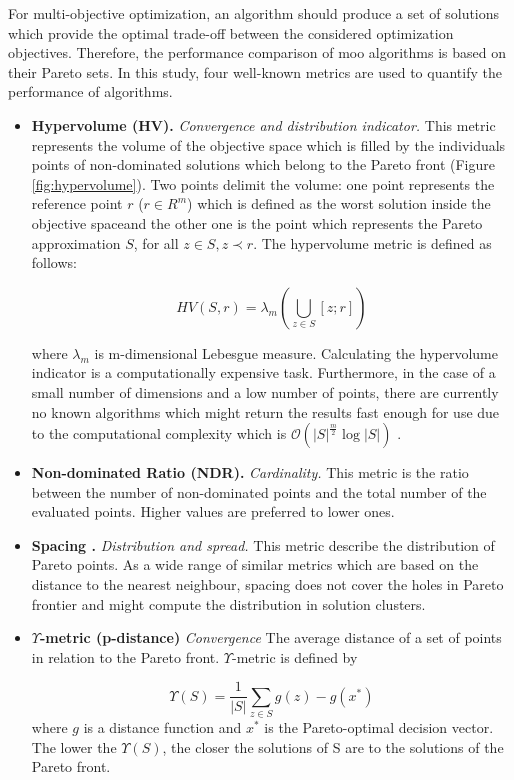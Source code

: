             For multi-objective optimization, an algorithm should produce a set of solutions which provide the optimal trade-off between the considered optimization objectives. Therefore, the performance comparison of \gls{moo} algorithms is based on their Pareto sets. In this study, four well-known metrics are used to quantify the performance of algorithms.
            \begin{itemize}
                \item \textbf{Hypervolume (HV).}\cite{ZitzlerDT00} \textit{Convergence and distribution indicator.}
                This metric represents the volume of the objective space which is filled by the individuals points of non-dominated solutions which belong to the Pareto front (Figure \ref{fig:hypervolume}). Two points delimit the volume: one point represents the reference point $r$ ($r \in R^m$) which is defined as the worst solution inside the objective spaceand the other one is the point which represents the Pareto approximation $S$, for all $z \in S, z \prec r$. The hypervolume metric is defined as follows:

                    \[HV(S,r) = \lambda_m(\bigcup\limits_{z \in S} [z;r])\]

                where $\lambda_m$ is m-dimensional Lebesgue measure.    
                Calculating the hypervolume indicator is a computationally expensive task. Furthermore, in the case of a small number of dimensions and a low number of points, there are currently no known algorithms which might return the results fast enough for use due to the computational complexity which is 
                $\mathcal{O}(|S|^{\frac{m}{2}}\log{|S|}) $ \cite{BeumeFLPV09}.
                \item \textbf{Non-dominated Ratio (NDR).} \textit{Cardinality.} This metric is the ratio between the number of non-dominated points and the total number of the evaluated points.  Higher values are preferred to lower ones.
                \item \textbf{Spacing \cite{Schott1995FaultTD}.} \textit{Distribution and spread.} This metric describe the distribution of Pareto points. As a wide range of similar metrics which are based on the distance to the nearest neighbour, spacing does not cover the holes in Pareto frontier and might compute the distribution in solution clusters.
                \item \textbf{$\Upsilon$-metric (p-distance)}\cite{Martens13} \textit{Convergence} The average distance of a set of points in relation to the Pareto front. $\Upsilon$-metric is defined by

                    \[\Upsilon(S) = \frac{1}{|S|}\sum_{z\in S}g(z)-g(x^*)\]
                where $g$ is a distance function and $x^*$ is the Pareto-optimal decision vector.
                The lower the $\Upsilon (S)$, the closer the solutions of S are to the solutions of the Pareto front. 
                
            \end{itemize}

